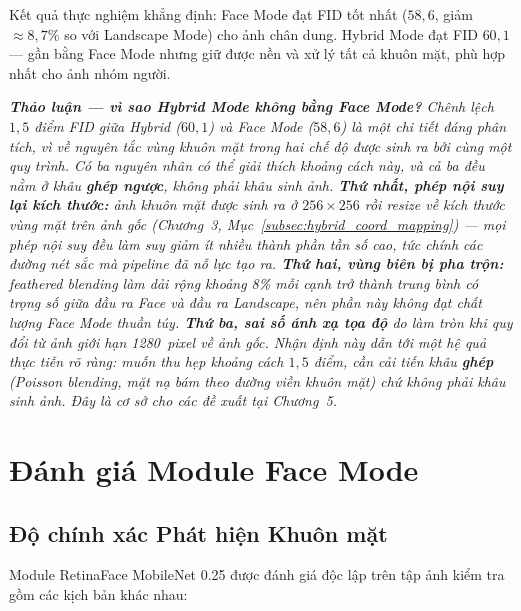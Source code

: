 Kết quả thực nghiệm khẳng định: Face Mode đạt FID tốt nhất ($58{,}6$, giảm $\approx 8{,}7\%$ so với Landscape Mode) cho ảnh chân dung. Hybrid Mode đạt FID $60{,}1$ --- gần bằng Face Mode nhưng giữ được nền và xử lý tất cả khuôn mặt, phù hợp nhất cho ảnh nhóm người.

\medskip
\noindent\textit{\textbf{Thảo luận --- vì sao Hybrid Mode không bằng Face Mode?} Chênh lệch $1{,}5$ điểm FID giữa Hybrid ($60{,}1$) và Face Mode ($58{,}6$) là một chi tiết đáng phân tích, vì về nguyên tắc vùng khuôn mặt trong hai chế độ được sinh ra bởi \textit{cùng một quy trình}. Có ba nguyên nhân có thể giải thích khoảng cách này, và cả ba đều nằm ở khâu \textbf{ghép ngược}, không phải khâu sinh ảnh. \textbf{Thứ nhất, phép nội suy lại kích thước:} ảnh khuôn mặt được sinh ra ở $256\times256$ rồi resize về kích thước vùng mặt trên ảnh gốc (Chương~3, Mục~\ref{subsec:hybrid_coord_mapping}) --- mọi phép nội suy đều làm suy giảm ít nhiều thành phần tần số cao, tức chính các đường nét sắc mà pipeline đã nỗ lực tạo ra. \textbf{Thứ hai, vùng biên bị pha trộn:} feathered blending làm dải rộng khoảng 8\% mỗi cạnh trở thành trung bình có trọng số giữa đầu ra Face và đầu ra Landscape, nên phần này không đạt chất lượng Face Mode thuần túy. \textbf{Thứ ba, sai số ánh xạ tọa độ} do làm tròn khi quy đổi từ ảnh giới hạn 1280~pixel về ảnh gốc. Nhận định này dẫn tới một hệ quả thực tiễn rõ ràng: muốn thu hẹp khoảng cách $1{,}5$ điểm, cần cải tiến khâu \textbf{ghép} (Poisson blending, mặt nạ bám theo đường viền khuôn mặt) chứ không phải khâu sinh ảnh. Đây là cơ sở cho các đề xuất tại Chương~5.}

\section{Đánh giá Module Face Mode}
\label{sec:face_extraction_eval}

\subsection{Độ chính xác Phát hiện Khuôn mặt}
\label{subsec:det_accuracy}

Module RetinaFace MobileNet 0.25 được đánh giá độc lập trên tập ảnh kiểm tra gồm các kịch bản khác nhau:

